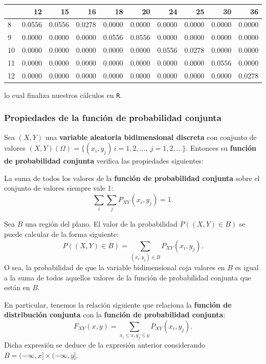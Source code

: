 \documentclass[]{book}
\begin{document}
\begin{tabular}{l|r|r|r|r|r|r|r|r|r}
\hline
  & 12 & 15 & 16 & 18 & 20 & 24 & 25 & 30 & 36\\
\hline
8 & 0.0556 & 0.0556 & 0.0278 & 0.0000 & 0.0000 & 0.0000 & 0.0000 & 0.0000 & 0.0000\\
\hline
9 & 0.0000 & 0.0000 & 0.0000 & 0.0556 & 0.0556 & 0.0000 & 0.0000 & 0.0000 & 0.0000\\
\hline
10 & 0.0000 & 0.0000 & 0.0000 & 0.0000 & 0.0000 & 0.0556 & 0.0278 & 0.0000 & 0.0000\\
\hline
11 & 0.0000 & 0.0000 & 0.0000 & 0.0000 & 0.0000 & 0.0000 & 0.0000 & 0.0556 & 0.0000\\
\hline
12 & 0.0000 & 0.0000 & 0.0000 & 0.0000 & 0.0000 & 0.0000 & 0.0000 & 0.0000 & 0.0278\\
\hline
\end{tabular}

lo cual finaliza nuestros cálculos en \texttt{R}.

\hypertarget{propiedades-de-la-funciuxf3n-de-probabilidad-conjunta}{%
\subsubsection{Propiedades de la función de probabilidad conjunta}\label{propiedades-de-la-funciuxf3n-de-probabilidad-conjunta}}

Sea \((X,Y)\) una \textbf{variable aleatoria bidimensional discreta} con conjunto de valores \((X,Y)(\Omega)=\{(x_i,y_j)\, i=1,2,\ldots,\ j=1,2,\ldots\}\). Entonces su \textbf{función de probabilidad conjunta} verifica las propiedades siguientes:

La suma de todos los valores de la \textbf{función de probabilidad conjunta} sobre el conjunto de valores siempre vale 1: \[\sum_{i}\sum_j P_{XY}(x_i,y_j)=1.\]

Sea \(B\) una región del plano. El valor de la probabilidad \(P((X,Y)\in B)\) se puede calcular de la forma siguiente:
\[
P((X,Y)\in B) =\sum_{(x_i,y_j)\in B} P_{XY}(x_i,y_j).
\]
O sea, la probabilidad de que la variable bidimensional coja valores en \(B\) es igual a la suma de todos aquellos valores de la función de probabilidad conjunta que están en \(B\).

En particular, tenemos la relación siguiente que relaciona la \textbf{función de distribución conjunta} con la \textbf{función de probabilidad conjunta}:
\[
F_{XY}(x,y)=\sum_{x_i\leq x, y_j\leq y} P_{XY}(x_i,y_j).
\]
Dicha expresión se deduce de la expresión anterior considerando \(B=(-\infty,x]\times (-\infty,y]\).
\end{document}
